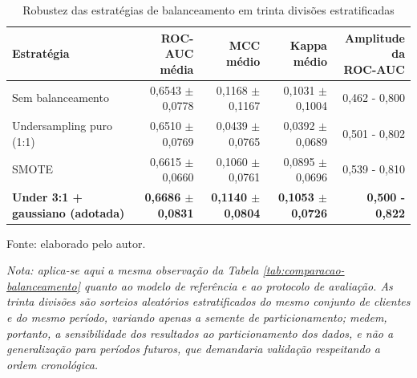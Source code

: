 \begin{table}[htbp]
\ABNTEXfontereduzida
\SingleSpacing
\caption{Robustez das estratégias de balanceamento em trinta divisões estratificadas}
\label{tab:robustez-balanceamento}
\centering
\scriptsize
\setlength{\tabcolsep}{4pt}
\begin{tabular}{@{}>{\raggedright\arraybackslash}p{4.0cm}rrrr@{}}
\hline
\textbf{Estratégia} & \shortstack[r]{\textbf{ROC-AUC}\\\textbf{média}} & \shortstack[r]{\textbf{MCC}\\\textbf{médio}} & \shortstack[r]{\textbf{Kappa}\\\textbf{médio}} & \shortstack[r]{\textbf{Amplitude da}\\\textbf{ROC-AUC}} \\
\hline
Sem balanceamento & 0,6543 $\pm$ 0,0778 & 0,1168 $\pm$ 0,1167 & 0,1031 $\pm$ 0,1004 & 0,462 - 0,800 \\
Undersampling puro (1:1) & 0,6510 $\pm$ 0,0769 & 0,0439 $\pm$ 0,0765 & 0,0392 $\pm$ 0,0689 & 0,501 - 0,802 \\
SMOTE & 0,6615 $\pm$ 0,0660 & 0,1060 $\pm$ 0,0761 & 0,0895 $\pm$ 0,0696 & 0,539 - 0,810 \\
\textbf{Under 3:1 + gaussiano (adotada)} & \textbf{0,6686 $\pm$ 0,0831} & \textbf{0,1140 $\pm$ 0,0804} & \textbf{0,1053 $\pm$ 0,0726} & \textbf{0,500 - 0,822} \\
\hline
\end{tabular}
\begin{flushleft}
	\ABNTEXfontereduzida
	\SingleSpacing
	Fonte: elaborado pelo autor.

	\textit{Nota: aplica-se aqui a mesma observação da Tabela \ref{tab:comparacao-balanceamento} quanto ao modelo de referência e ao protocolo de avaliação. As trinta divisões são sorteios aleatórios estratificados do mesmo conjunto de clientes e do mesmo período, variando apenas a semente de particionamento; medem, portanto, a sensibilidade dos resultados ao particionamento dos dados, e não a generalização para períodos futuros, que demandaria validação respeitando a ordem cronológica.}
\end{flushleft}
\end{table}

